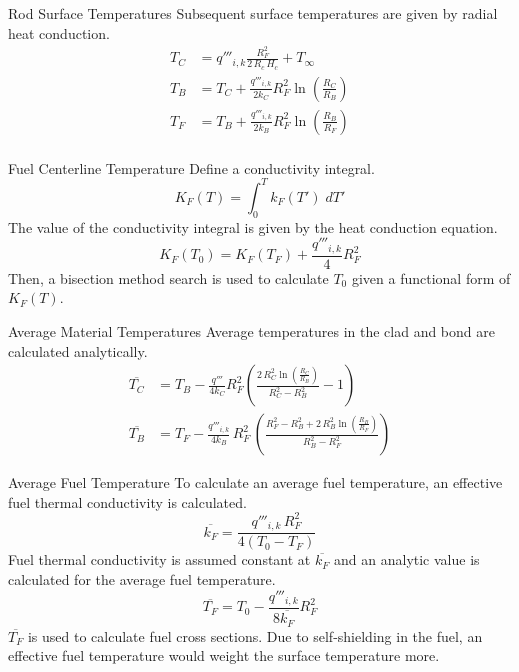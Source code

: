 \begin{frame}{Rod Surface Temperatures}
  Subsequent surface temperatures are given by radial heat conduction.
  \begin{align}
    \label{eq:tc_forward}
    T_C &= q'''_{i,k} \frac{R_F^2}{2\,R_c\,H_c} + T_{\infty} \\
    \label{eq:tb_forward}
    T_B &= T_C + \frac{q'''_{i,k}}{2 k_C} R_F^2
      \ln\left(\frac{R_C}{R_B}\right) \\
    \label{eq:tf_forward}
    T_F &= T_B + \frac{q'''_{i,k}}{2 k_B} R_F^2 
      \ln\left(\frac{R_B}{R_F}\right) \\
  \end{align}
\end{frame}

\begin{frame}{Fuel Centerline Temperature}
  Define a conductivity integral.
  \begin{equation}
    \label{eq:conductivity_integral}
    K_F(T) = \int_0^T k_F(T') \; dT'
  \end{equation}
  The value of the conductivity integral is given by the heat conduction
  equation.
  \begin{equation}
    \label{eq:tcl_conductivity_integral}
    K_F(T_0) = K_F(T_F) + \frac{q'''_{i,k}}{4} R_F^2
  \end{equation}
  Then, a bisection method search is used to calculate $T_0$ given a functional
  form of $K_F(T)$.
\end{frame}

\begin{frame}{Average Material Temperatures}
  Average temperatures in the clad and bond are calculated analytically.
  \begin{align}
    \label{eq:tc_bar}
    \overline{T_C} &= T_B - \frac{q'''}{4 k_C} R_F^2 \left(
      \frac{2 \, R_C^2 \ln\left(\frac{R_C}{R_B}\right)}
      {R_C^2 - R_B^2}  - 1\right) \\
    \label{eq:tb_bar}
    \overline{T_B} &= T_F - \frac{q'''_{i,k}}{4 k_B} \, R_F^2 \, \left(
      \frac{R_F^2 - R_B^2 + 2\,R_B^2 \ln\left(\frac{R_B}{R_F}\right)}
      {R_B^2-R_F^2}\right)
  \end{align}
\end{frame}

\begin{frame}{Average Fuel Temperature}
  To calculate an average fuel temperature, an effective fuel thermal
  conductivity is calculated.
  \begin{equation}
    \label{eq:kfuel_constant}
    \overline{k_F} = \frac{q'''_{i,k} \, R_F^2}{4(T_0-T_F)}
  \end{equation}
  Fuel thermal conductivity is assumed constant at $\overline{k_F}$ and an
  analytic value is calculated for the average fuel temperature.
  \begin{equation}
    \label{eq:tf_bar}
    \overline{T_F} = T_0 - \frac{q'''_{i,k}}{8 \overline{k_F}} R_F^2
  \end{equation}
  $\overline{T_F}$ is used to calculate fuel cross sections. Due to
  self-shielding in the fuel, an effective fuel temperature would weight the
  surface temperature more.
\end{frame}

